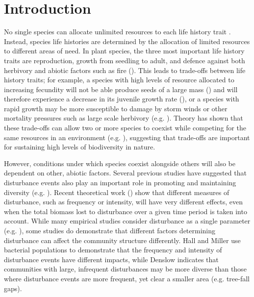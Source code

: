 

\section{Introduction}
No single species can allocate unlimited resources to each life history trait \cite{law1979optimal}. Instead, species life histories are determined by the allocation of limited resources to different areas of need. In plant species, the three most important life history traits are reproduction, growth from seedling to adult, and defence against both herbivory and abiotic factors such as fire (\cite{bazzaz1987allocating}). This leads to trade-offs between life history traits; for example, a species with high levels of resource allocated to increasing fecundity will not be able produce seeds of a large mass (\cite{turnbull1999seed}) and will therefore experience a decrease in its juvenile growth rate (\cite{gross1984effects}), or a species with rapid growth may be more susceptible to damage by storm winds or other mortality pressures such as large scale herbivory (e.g. \cite{wright2010functional,fine2006growth}). Theory has shown that these trade-offs can allow two or more species to coexist while competing for  the same resources in an environment (e.g. \cite{kisdi2003coexistence,levins1971regional,bonsall2004life}), suggesting that trade-offs are important for sustaining high levels of biodiversity in nature.

However, conditions under which species coexist alongside others will also be dependent on other, abiotic factors. Several previous studies have suggested that disturbance events also play an important role in promoting and maintaining diversity (e.g. \cite{sousa1984role,denslow1987tropical}).  Recent theoretical work (\cite{miller2011frequency}) show that different measures of disturbance, such as frequency or intensity, will have very different effects, even when the total biomass lost to disturbance over a given time period is taken into account. While many empirical studies consider disturbance as a single parameter (e.g. \cite{molino2001tree,peterson1997tornado,nakagawa2000impact}), some studies do demonstrate that different factors determining disturbance can affect the community structure differently. Hall and Miller \cite{hall2012diversity} use bacterial populations to demonstrate that the frequency and intensity of disturbance events have different impacts, while Denslow \cite{denslow1980patterns} indicates that communities with large, infrequent disturbances may be more diverse than those where disturbance events are more frequent, yet clear a smaller area (e.g. tree-fall gaps).

